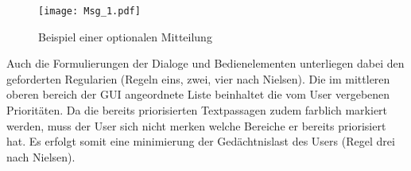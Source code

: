 \begin{figure}[H]
\centering
\texttt{[image: Msg\_1.pdf]}
\caption{Beispiel einer optionalen Mitteilung}
\label{fig:Msg1}
\end{figure}

Auch die Formulierungen der Dialoge und Bedienelementen unterliegen dabei den
geforderten Regularien (Regeln eins, zwei, vier nach Nielsen). Die im mittleren
oberen bereich der GUI angeordnete Liste beinhaltet die vom User vergebenen
Priorit{\"a}ten. Da die bereits priorisierten Textpassagen zudem farblich
markiert werden, muss der User sich nicht merken welche Bereiche er bereits priorisiert
hat. Es erfolgt somit eine minimierung der Ged{\"a}chtnislast des Users
(Regel drei nach Nielsen).


